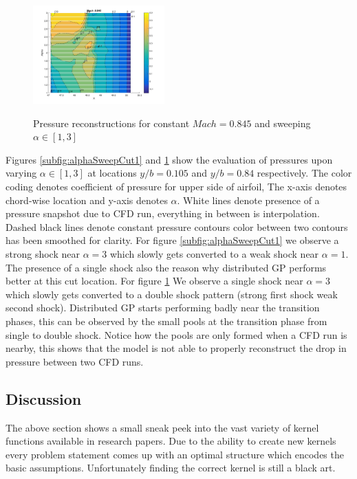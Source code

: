 \begin{figure}[!ht]
    {\includegraphics[width=0.45\textwidth]{images/CRM-clean-testSnapshots_cut4_MachSweepContF845}\label{subfig:alphaSweepCut4}}
  \caption{Pressure reconstructions for constant \(Mach = 0.845\) and sweeping \(\alpha \in [1, 3]\)}
\end{figure}\label{fig:alphaSweep}

Figures \ref{subfig:alphaSweepCut1} and \ref{subfig:alphaSweepCut4} show the evaluation of pressures upon varying \(\alpha \in [1, 3]\) at locations \(y/b = 0.105\) and \(y/b = 0.84\) respectively. The color coding denotes coefficient of pressure for upper side of airfoil, The x-axis denotes chord-wise location and y-axis denotes \(\alpha\). White lines denote presence of a pressure snapshot due to CFD run, everything in between is interpolation. Dashed black lines denote constant pressure contours color between two contours has been smoothed for clarity. For figure \ref{subfig:alphaSweepCut1} we observe a strong shock near \(\alpha = 3\) which slowly gets converted to a weak shock near \(\alpha = 1\). The presence of a single shock also the reason why distributed GP performs better at this cut location. For figure \ref{subfig:alphaSweepCut4} We observe a single shock near \(\alpha = 3\) which slowly gets converted to a double shock pattern (strong first shock weak second shock). Distributed GP starts performing badly near the transition phases, this can be observed by the small pools at the transition phase from single to double shock. Notice how the pools are only formed when a CFD run is nearby, this shows that the model is not able to properly reconstruct the drop in pressure between two CFD runs. 

\subsection{Discussion}\label{subsec:ExpressingStructureKernelConclusion}
The above section shows a small sneak peek into the vast variety of kernel functions available in research papers. Due to the ability to create new kernels every problem statement comes up with an optimal structure which encodes the basic assumptions. Unfortunately finding the correct kernel is still a black art. 
 
